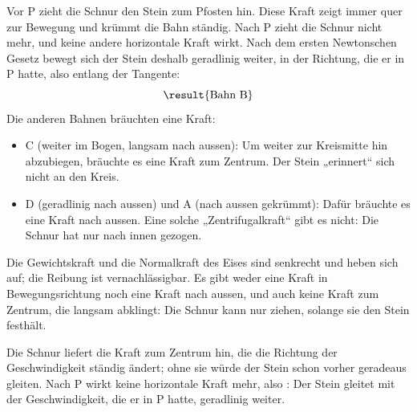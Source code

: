 \begin{abcliste}
\abc
Vor P zieht die Schnur den Stein zum Pfosten hin. Diese Kraft zeigt immer quer zur Bewegung und krümmt die Bahn ständig. Nach P zieht die Schnur nicht mehr, und keine andere horizontale Kraft wirkt. Nach dem ersten Newtonschen Gesetz bewegt sich der Stein deshalb geradlinig weiter, in der Richtung, die er in P hatte, also entlang der Tangente:
\[
 \result{\text{Bahn B}}
\]
Die anderen Bahnen bräuchten eine Kraft:
\begin{itemize}
\item C (weiter im Bogen, langsam nach aussen): Um weiter zur Kreismitte hin abzubiegen, bräuchte es eine Kraft zum Zentrum. Der Stein „erinnert“ sich nicht an den Kreis.
\item D (geradlinig nach aussen) und A (nach aussen gekrümmt): Dafür bräuchte es eine Kraft nach aussen. Eine solche „Zentrifugalkraft“ gibt es nicht: Die Schnur hat nur nach innen gezogen.
\end{itemize}

\abc
{} Die Gewichtskraft und die Normalkraft des Eises sind senkrecht und heben sich auf; die Reibung ist vernachlässigbar. Es gibt weder eine Kraft in Bewegungsrichtung noch eine Kraft nach aussen, und auch keine Kraft zum Zentrum, die langsam abklingt: Die Schnur kann nur ziehen, solange sie den Stein festhält.

\abc
Die Schnur liefert die Kraft zum Zentrum hin, die die Richtung der Geschwindigkeit ständig ändert; ohne sie würde der Stein schon vorher geradeaus gleiten. Nach P wirkt keine horizontale Kraft mehr, also : Der Stein gleitet mit der Geschwindigkeit, die er in P hatte, geradlinig weiter.
\end{abcliste}
